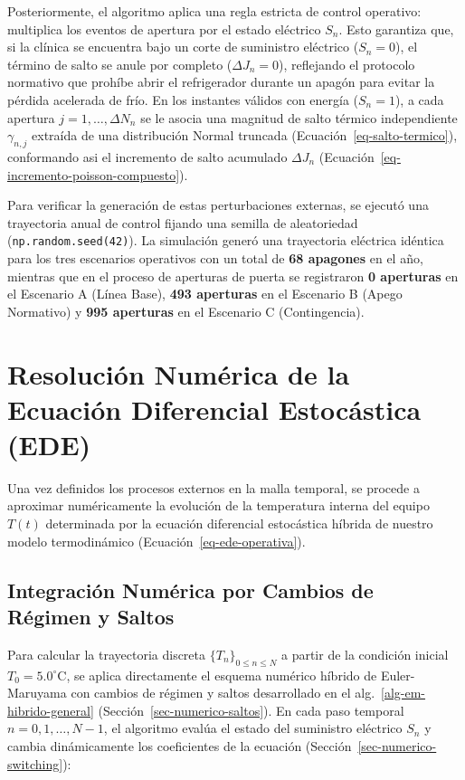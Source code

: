 \documentclass[
  spanish,
  us-letterpaper,
]{scrreprt}
\numberwithin{equation}{section}
\theoremstyle{plain}
\theoremstyle{plain}
\theoremstyle{plain}
\theoremstyle{definition}
\theoremstyle{remark}
\begin{document}
Posteriormente, el algoritmo aplica una regla estricta de control
operativo: multiplica los eventos de apertura por el estado eléctrico
\(S_n\). Esto garantiza que, si la clínica se encuentra bajo un corte de
suministro eléctrico (\(S_n = 0\)), el término de salto se anule por
completo (\(\Delta J_n = 0\)), reflejando el protocolo normativo que
prohíbe abrir el refrigerador durante un apagón para evitar la pérdida
acelerada de frío. En los instantes válidos con energía (\(S_n = 1\)), a
cada apertura \(j = 1, \dots, \Delta N_n\) se le asocia una magnitud de
salto térmico independiente \(\gamma_{n, j}\) extraída de una
distribución Normal truncada (Ecuación~\ref{eq-salto-termico}),
conformando asi el incremento de salto acumulado \(\Delta J_n\)
(Ecuación~\ref{eq-incremento-poisson-compuesto}).

Para verificar la generación de estas perturbaciones externas, se
ejecutó una trayectoria anual de control fijando una semilla de
aleatoriedad (\texttt{np.random.seed(42)}). La simulación generó una
trayectoria eléctrica idéntica para los tres escenarios operativos con
un total de \textbf{68 apagones} en el año, mientras que en el proceso
de aperturas de puerta se registraron \textbf{0 aperturas} en el
Escenario A (Línea Base), \textbf{493 aperturas} en el Escenario B
(Apego Normativo) y \textbf{995 aperturas} en el Escenario C
(Contingencia).

\section{Resolución Numérica de la Ecuación Diferencial Estocástica
(EDE)}\label{resoluciuxf3n-numuxe9rica-de-la-ecuaciuxf3n-diferencial-estocuxe1stica-ede}

Una vez definidos los procesos externos en la malla temporal, se procede
a aproximar numéricamente la evolución de la temperatura interna del
equipo \(T(t)\) determinada por la ecuación diferencial estocástica
híbrida de nuestro modelo termodinámico
(Ecuación~\ref{eq-ede-operativa}).

\subsection{Integración Numérica por Cambios de Régimen y
Saltos}\label{integraciuxf3n-numuxe9rica-por-cambios-de-ruxe9gimen-y-saltos}

Para calcular la trayectoria discreta \(\{T_n\}_{0 \le n \le N}\) a
partir de la condición inicial \(T_0 = 5.0^\circ\text{C}\), se aplica
directamente el esquema numérico híbrido de Euler-Maruyama con cambios
de régimen y saltos desarrollado en el alg.~\ref{alg-em-hibrido-general}
(Sección~\ref{sec-numerico-saltos}). En cada paso temporal
\(n = 0, 1, \dots, N - 1\), el algoritmo evalúa el estado del suministro
eléctrico \(S_n\) y cambia dinámicamente los coeficientes de la ecuación
(Sección~\ref{sec-numerico-switching}):
\end{document}
